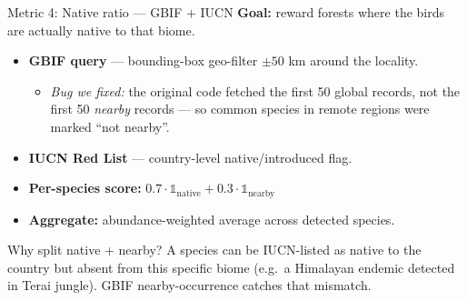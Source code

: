 \documentclass[aspectratio=169]{beamer}
\begin{document}
\begin{frame}{Metric 4: Native ratio --- GBIF $+$ IUCN}
  \textbf{Goal:} reward forests where the birds are actually native to that biome.
  \vspace{0.3em}
  \begin{itemize}
    \item \textbf{GBIF query} --- bounding-box geo-filter $\pm 50$ km around the locality.
      \begin{itemize}
        \item \textit{Bug we fixed:} the original code fetched the first 50 global records, not the first 50 \emph{nearby} records --- so common species in remote regions were marked ``not nearby''.
      \end{itemize}
    \item \textbf{IUCN Red List} --- country-level native/introduced flag.
    \item \textbf{Per-species score:} $0.7 \cdot \mathbb{1}_\text{native} + 0.3 \cdot \mathbb{1}_\text{nearby}$
    \item \textbf{Aggregate:} abundance-weighted average across detected species.
  \end{itemize}
  \vspace{0.4em}
  \begin{alertblock}{Why split native + nearby?}
    A species can be IUCN-listed as native to the country but absent from this specific biome (e.g.\ a Himalayan endemic detected in Terai jungle). GBIF nearby-occurrence catches that mismatch.
  \end{alertblock}
\end{frame}
\end{document}
